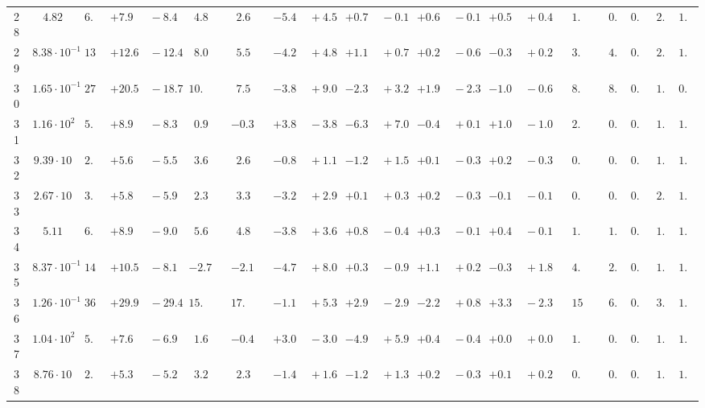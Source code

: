 \documentclass[12pt]{article}
\begin{document}
\begin{table}
\begin{tabular}{ccrr@{\hskip0pt}rrc@{\hskip0pt}r@{\hskip0pt}c@{\hskip0pt}r@{\hskip0pt}rr@{\hskip0pt}rr@{\hskip0pt}rr@{\hskip0pt}rr@{\hskip0pt}r@{\hskip0pt}r@{\hskip0pt}c|rr|r}
28 &$4.82$ &$ 6.5$  & ${+7.9~}$&${~-8.4}$ & $ 4.8$  & &$ 2.6$&&${-5.4~}$&${~+4.5}$ & ${+0.7~}$&${~-0.1}$ & ${+0.6~}$&${~-0.1}$ & ${+0.5~}$&${~+0.4}$ & &$ 1.6$&&$ 0.9$  & $0.96$  & $ 2.0$  & $1.03$   \\ 
29 &$8.38 \cdot 10^{-1}$ &$13.5$  & ${+12.6~}$&${~-12.4}$ & $ 8.0$  & &$ 5.5$&&${-4.2~}$&${~+4.8}$ & ${+1.1~}$&${~+0.7}$ & ${+0.2~}$&${~-0.6}$ & ${-0.3~}$&${~+0.2}$ & &$ 3.7$&&$ 4.4$  & $0.95$  & $ 2.5$  & $1.03$   \\ 
30 &$1.65 \cdot 10^{-1}$ &$27.8$  & ${+20.5~}$&${~-18.7}$ & $10.4$  & &$ 7.5$&&${-3.8~}$&${~+9.0}$ & ${-2.3~}$&${~+3.2}$ & ${+1.9~}$&${~-2.3}$ & ${-1.0~}$&${~-0.6}$ & &$ 8.7$&&$ 8.4$  & $0.95$  & $ 1.1$  & $0.96$   \\ 
31 &$1.16 \cdot 10^{2}$ &$ 5.4$  & ${+8.9~}$&${~-8.3}$ & $ 0.9$  & &$-0.3$&&${+3.8~}$&${~-3.8}$ & ${-6.3~}$&${~+7.0}$ & ${-0.4~}$&${~+0.1}$ & ${+1.0~}$&${~-1.0}$ & &$ 2.4$&&$ 0.5$  & $0.90$  & $ 1.5$  & $1.03$   \\ 
32 &$9.39 \cdot 10$ &$ 2.7$  & ${+5.6~}$&${~-5.5}$ & $ 3.6$  & &$ 2.6$&&${-0.8~}$&${~+1.1}$ & ${-1.2~}$&${~+1.5}$ & ${+0.1~}$&${~-0.3}$ & ${+0.2~}$&${~-0.3}$ & &$ 0.9$&&$ 0.2$  & $0.94$  & $ 1.8$  & $1.03$   \\ 
33 &$2.67 \cdot 10$ &$ 3.1$  & ${+5.8~}$&${~-5.9}$ & $ 2.3$  & &$ 3.3$&&${-3.2~}$&${~+2.9}$ & ${+0.1~}$&${~+0.3}$ & ${+0.2~}$&${~-0.3}$ & ${-0.1~}$&${~-0.1}$ & &$ 0.7$&&$ 0.4$  & $0.95$  & $ 2.0$  & $1.03$   \\ 
34 &$5.11$ &$ 6.2$  & ${+8.9~}$&${~-9.0}$ & $ 5.6$  & &$ 4.8$&&${-3.8~}$&${~+3.6}$ & ${+0.8~}$&${~-0.4}$ & ${+0.3~}$&${~-0.1}$ & ${+0.4~}$&${~-0.1}$ & &$ 1.5$&&$ 1.0$  & $0.96$  & $ 1.6$  & $1.03$   \\ 
35 &$8.37 \cdot 10^{-1}$ &$14.4$  & ${+10.5~}$&${~-8.1}$ & $-2.7$  & &$-2.1$&&${-4.7~}$&${~+8.0}$ & ${+0.3~}$&${~-0.9}$ & ${+1.1~}$&${~+0.2}$ & ${-0.3~}$&${~+1.8}$ & &$ 4.3$&&$ 2.3$  & $0.96$  & $ 1.8$  & $1.03$   \\ 
36 &$1.26 \cdot 10^{-1}$ &$36.0$  & ${+29.9~}$&${~-29.4}$ & $15.5$  & &$17.9$&&${-1.1~}$&${~+5.3}$ & ${+2.9~}$&${~-2.9}$ & ${-2.2~}$&${~+0.8}$ & ${+3.3~}$&${~-2.3}$ & &$15.3$&&$ 6.7$  & $0.96$  & $ 3.0$  & $1.04$   \\ 
37 &$1.04 \cdot 10^{2}$ &$ 5.2$  & ${+7.6~}$&${~-6.9}$ & $ 1.6$  & &$-0.4$&&${+3.0~}$&${~-3.0}$ & ${-4.9~}$&${~+5.9}$ & ${+0.4~}$&${~-0.4}$ & ${+0.0~}$&${~+0.0}$ & &$ 1.8$&&$ 0.5$  & $0.90$  & $ 1.0$  & $1.04$   \\ 
38 &$8.76 \cdot 10$ &$ 2.5$  & ${+5.3~}$&${~-5.2}$ & $ 3.2$  & &$ 2.3$&&${-1.4~}$&${~+1.6}$ & ${-1.2~}$&${~+1.3}$ & ${+0.2~}$&${~-0.3}$ & ${+0.1~}$&${~+0.2}$ & &$ 0.7$&&$ 0.3$  & $0.94$  & $ 1.3$  & $1.03$   \\ 

\end{tabular}
\end{table}
\end{document}
